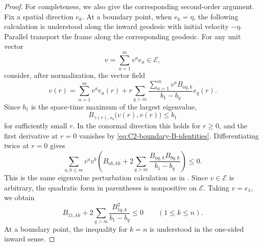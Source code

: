 \documentclass[11pt, reqno]{amsart}
\theoremstyle{remark}
\theoremstyle{definition}
\numberwithin{equation}{section}
\begin{document}
\begin{proof}
For completeness, we also give the corresponding second-order
argument. Fix a spatial direction $e_k$. At a boundary point,
when $e_k=\eta$, the following calculation is understood along
the inward geodesic with initial velocity $-\eta$. Parallel
transport the frame along the corresponding geodesic. For any
unit vector
\begin{equation*}
        v=\sum_{a=1}^m v^ae_a\in\mathcal E,
\end{equation*}
consider, after normalization, the vector field
\begin{equation*}
        v(r)
        =
        \sum_{a=1}^m v^ae_a(r)
        +
        r\sum_{q>m}
        \frac{
            \sum_{a=1}^m v^aB_{aq,k}
        }{b_1-b_q}
        e_q(r).
\end{equation*}
Since $b_1$ is the space-time maximum of the largest eigenvalue,
\begin{equation*}
        B_{\gamma(r),s_0}\big(v(r),v(r)\big)
        \leq b_1
\end{equation*}
for sufficiently small $r$. In the conormal direction this holds
for $r\geq0$, and the first derivative at $r=0$ vanishes by
\eqref{eq:C2-boundary-B-identities}. Differentiating twice at
$r=0$ gives
\begin{equation*}
        \sum_{a,b\leq m}v^av^b
        \left(
            B_{ab,kk}
            +
            2\sum_{q>m}
            \frac{B_{aq,k}B_{bq,k}}{b_1-b_q}
        \right)
        \leq0.
\end{equation*}
This is the same eigenvalue perturbation calculation as in
\cite[Lemma~5]{BCD2017}. Since $v\in\mathcal E$ is arbitrary, the
quadratic form in parentheses is nonpositive on $\mathcal E$.
Taking $v=e_1$, we obtain
\begin{equation}\label{eq:C2-spectral-second-variation}
        B_{11,kk}
        +
        2\sum_{q>m}
        \frac{B_{1q,k}^2}{b_1-b_q}
        \leq0
        \qquad
        (1\leq k\leq n).
\end{equation}
At a boundary point, the inequality for $k=n$ is understood in
the one-sided inward sense.


\end{proof}
\end{document}
